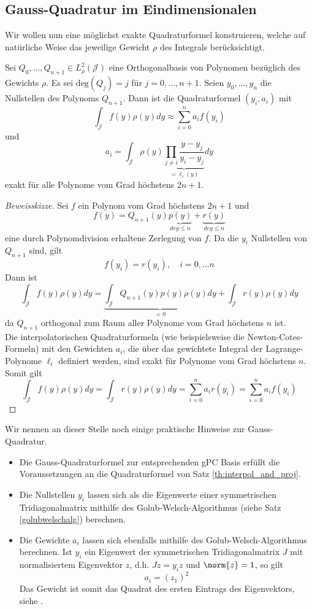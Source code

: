 \subsection{Gauss-Quadratur im Eindimensionalen}
Wir wollen nun eine möglichst exakte Quadraturformel konstruieren, welche auf natürliche Weise das jeweilige Gewicht $\rho$ des Integrals berücksichtigt.
\begin{maththeorem}
Sei $Q_0,\dots,Q_{n+1}\in L_\rho^2(\mathcal{J})$ eine Orthogonalbasis von Polynomen bezüglich des Gewichts $\rho$. Es sei $\text{deg}(Q_j)=j$ für $j=0,\dots,n+1$. Seien $y_0,\dots,y_n$ die Nullstellen des Polynoms $Q_{n+1}$. Dann ist die Quadraturformel $(y_i,a_i)$ mit 
\[\int_\mathcal{J}f(y)\rho(y)dy\approx \sum_{i=0}^na_if(y_i)\]
und 
\[a_i=\int_\mathcal{J} \rho(y)\underbrace{\prod_{j\neq i} \frac{y-y_j}{y_i-y_j}}_{=\ell_i(y)}dy\]
exakt für alle Polynome vom Grad höchstens $2n+1$.
\end{maththeorem} 
\begin{proof}[Beweisskizze]
Sei $f$ ein Polynom vom Grad höchstens $2n+1$ und 
\[f(y)=Q_{n+1}(y)\underbrace{p(y)}_{deg \le n}+\underbrace{r(y)}_{deg \le n}\]
eine durch Polynomdivision erhaltene Zerlegung von $f$. Da die $y_i$ Nullstellen von $Q_{n+1}$ sind, gilt
\[f(y_i)=r(y_i),\quad i=0,\dots n\]
Dann ist
\[\int_\mathcal{J}f(y)\rho(y)dy=\underbrace{\int_\mathcal{J}Q_{n+1}(y)p(y)\rho(y)dy}_{=0}+\int_\mathcal{J}r(y)\rho(y)dy\]
da $Q_{n+1}$ orthogonal zum Raum aller Polynome vom Grad höchstens $n$ ist.\\
Die interpolatorischen Quadraturformeln (wie beispielsweise die Newton-Cotes-Formeln) mit den Gewichten $a_i$, die über das gewichtete Integral der Lagrange-Polynome $\ell_i$ definiert werden, sind exakt für Polynome vom Grad höchstens $n$. Somit gilt
\[\int_\mathcal{J}f(y)\rho(y)dy=\int_\mathcal{J}r(y)\rho(y)dy=\sum_{i=0}^{n}a_ir(y_i)=\sum_{i=0}^{n}a_if(y_i)\]
\end{proof}
\begin{mathbem}
\label{bem:gaussquad}
Wir nennen an dieser Stelle noch einige praktische Hinweise zur Gauss-Quadratur.
\begin{itemize}
\item Die Gauss-Quadraturformel zur entsprechenden gPC Basis erfüllt die Voraussetzungen an die Quadraturformel von Satz \ref{th:interpol_and_proj}.
\item Die Nullstellen $y_i$ lassen sich als die Eigenwerte einer symmetrischen Tridiagonalmatrix mithilfe des Golub-Welsch-Algorithmus (siehe Satz \ref{golubwelschalg}) berechnen.
\item Die Gewichte $a_i$ lassen sich ebenfalls mithilfe des Golub-Welsch-Algorithmus berechnen. Ist $y_i$ ein Eigenwert der symmetrischen Tridiagonalmatrix $J$ mit normalisiertem Eigenvektor $z$, d.h. $Jz=y_iz$ und $\norm{z}=1$, so gilt
\[a_i=(z_1)^2\]
Das Gewicht ist somit das Quadrat des ersten Eintrags des Eigenvektors, siehe \autocite{GolubWelsch}.
\end{itemize}
\end{mathbem}

